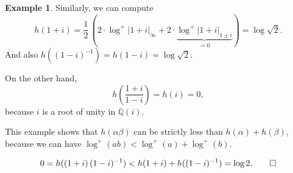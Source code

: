 \documentclass{article}
\theoremstyle{definition}
\newtheorem{example}[proposition]{Example}
\newcommand{\QQ}{\mathbb{Q}}
\renewcommand{\O}{\mathcal{O}}
\begin{document}
\begin{example}
  Similarly, we can compute
  $$h (1+i) = \frac{1}{2} \, (2\cdot \log^+ |1+i|_\infty + 2\cdot \underbrace{\log^+ |1+i|_{1\pm i}}_{= 0}) = \log \sqrt{2}.$$
  And also $h ((1-i)^{-1}) = h (1-i) = \log \sqrt{2}.$

  On the other hand,
  $$h \left(\frac{1+i}{1-i}\right) = h (i) = 0,$$
  because $i$ is a root of unity in $\QQ (i)$.

  This example shows that $h (\alpha\beta)$ can be strictly less than
  $h (\alpha) + h (\beta)$, because we can have
  $\log^+ (ab) < \log^+ (a) + \log^+ (b)$.

  \[ 0 = h ((1+i) \, (1-i)^{-1}) < h (1+i) + h ((1-i)^{-1}) = \log 2. \qedhere \]
\end{example}






\end{document}

